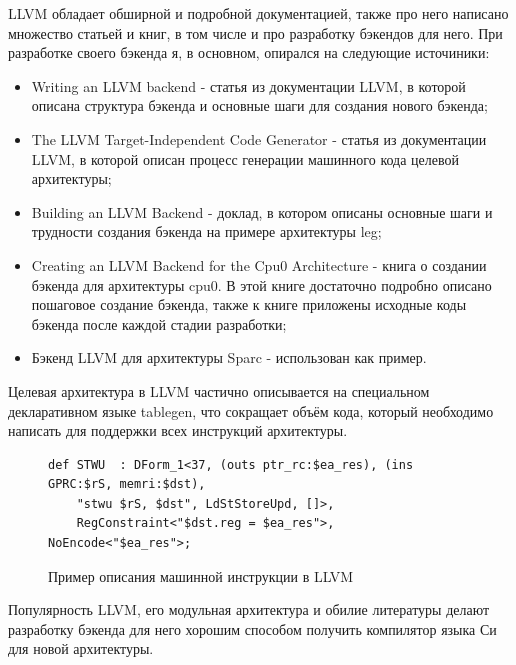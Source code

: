 \documentclass[a4paper,14pt]{extarticle}
\begin{document}
LLVM обладает обширной и подробной документацией, также про него написано множество статьей и книг, в том числе и про разработку бэкендов для него. При разработке своего бэкенда я, в основном, опирался на следующие источиники:
\begin{itemize}
	\item Writing an LLVM backend\cite{llvm:writing_backend} - статья из документации LLVM, в которой описана структура бэкенда и основные шаги для создания нового бэкенда;
	\item The LLVM Target-Independent Code Generator\cite{llvm:codegen} - статья из документации LLVM, в которой описан процесс генерации машинного кода целевой архитектуры;
	\item Building an LLVM Backend\cite{llvmleg} - доклад, в котором описаны основные шаги и трудности создания бэкенда на примере архитектуры leg;
	\item Creating an LLVM Backend for the Cpu0 Architecture\cite{cpu0} - книга о создании бэкенда для архитектуры cpu0. В этой книге достаточно подробно описано пошаговое создание бэкенда, также к книге приложены исходные коды бэкенда после каждой стадии разработки;
	\item Бэкенд LLVM для архитектуры Sparc\cite{llvm:sparc} - использован как пример.
\end{itemize}

Целевая архитектура в LLVM частично описывается на специальном декларативном языке tablegen, что сокращает объём кода, который необходимо написать для поддержки всех инструкций архитектуры\cite{llvm:codegen}.
\begin{figure}[h!]
	\begin{verbatim}
def STWU  : DForm_1<37, (outs ptr_rc:$ea_res), (ins GPRC:$rS, memri:$dst),
	"stwu $rS, $dst", LdStStoreUpd, []>,
	RegConstraint<"$dst.reg = $ea_res">, NoEncode<"$ea_res">;
	\end{verbatim}
	\caption{Пример описания машинной инструкции в LLVM\cite{llvm:codegen}}
\end{figure}

Популярность  LLVM, его модульная архитектура и обилие литературы делают разработку бэкенда для него хорошим способом получить компилятор языка Си для новой архитектуры.
\end{document}
